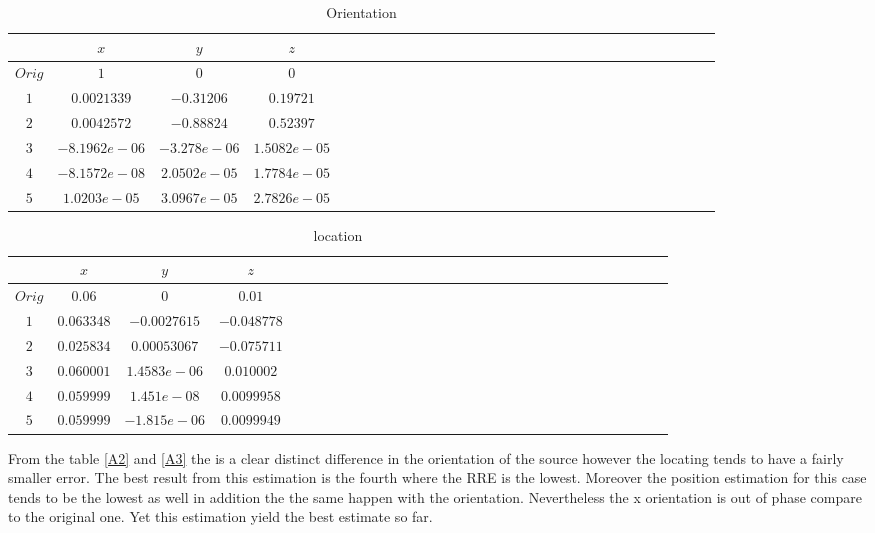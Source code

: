  \begin{table}[!htbp]
\centering
\caption{Orientation}\label{A3}
\label{table:5}
\begin{tabular}{c c c c c c c c c c c c c c c c c c c c c c c c c c c c c c c } 
   \hline 
$ $&$x$&$y$&$z$\\
   \hline 
$ Orig$&$1$&$0$&$0$\\
$1$&$0.0021339 $&$-0.31206$&$ 0.19721$\\
$2$&$ 0.0042572$&$ -0.88824$&$   0.52397$\\
$3$&$-8.1962e-06$&$-3.278e-06$&$  1.5082e-05$\\
$4$&$-8.1572e-08$&$2.0502e-05$&$1.7784e-05$\\
$5$&$1.0203e-05$&$3.0967e-05$&$2.7826e-05$\\
\hline 

\end{tabular}
\end{table}


 \begin{table}[!htbp]
\centering
\caption{location}\label{A2}
\label{table:5}
\begin{tabular}{c c c c c c c c c c c c c c c c c c c c c c c c c c c c c c c } 
   \hline 
$ $&$x$&$y$&$z$\\
   \hline 
$ Orig$&$0.06$&$0$&$0.01$\\
$1$&$0.063348$&$-0.0027615$&$-0.048778$\\
$2$&$0.025834$&$0.00053067$&$-0.075711$\\ 
$3$&$0.060001$&$1.4583e-06 $&$0.010002$\\
$4$&$0.059999$&$1.451e-08$&$0.0099958 $\\
$5$&$0.059999$&$-1.815e-06$&$0.0099949 $\\
\hline 

\end{tabular}
\end{table}

From the table \ref{A2} and \ref{A3} the is a clear distinct difference in the orientation of the source however the locating tends to have a fairly smaller error. The best result from this estimation is the fourth where the RRE is the lowest. Moreover the position estimation for this case tends to be the lowest as well in addition the the same happen with the orientation. Nevertheless the x orientation is out of phase compare to the original one. Yet this estimation yield the best estimate so far. 

